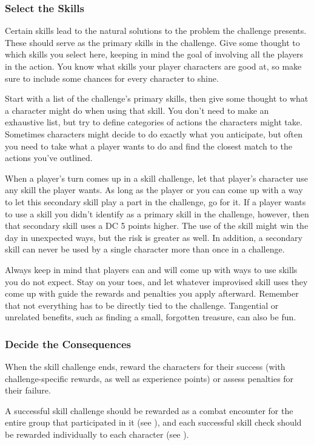 \subsubsection{Select the Skills}
Certain skills lead to the natural solutions to the problem the challenge presents. These should serve as the primary skills in the challenge. Give some thought to which skills you select here, keeping in mind the goal of involving all the players in the action. You know what skills your player characters are good at, so make sure to include some chances for every character to shine.

Start with a list of the challenge's primary skills, then give some thought to what a character might do when using that skill. You don't need to make an exhaustive list, but try to define categories of actions the characters might take. Sometimes characters might decide to do exactly what you anticipate, but often you need to take what a player wants to do and find the closest match to the actions you've outlined.

When a player's turn comes up in a skill challenge, let that player's character use any skill the player wants. As long as the player or you can come up with
a way to let this secondary skill play a part in the challenge, go for it. If a player wants to use a skill you didn't identify as a primary skill in the challenge, however, then that secondary skill uses a DC 5 points higher. The use of the skill might win the day in unexpected ways, but the risk is greater as well. In addition, a secondary skill can never be used by a single character more than once in a challenge.

Always keep in mind that players can and will come up with ways to use skills you do not expect. Stay on your toes, and let whatever improvised skill uses they come up with guide the rewards and penalties you apply afterward. Remember that not everything has to be directly tied to the challenge. Tangential or unrelated benefits, such as finding a small, forgotten treasure, can also be fun.

\subsubsection{Decide the Consequences}
When the skill challenge ends, reward the characters for their success (with challenge-specific rewards, as well as experience points) or assess penalties for their failure.

A successful skill challenge should be rewarded as a combat encounter for the entire group that participated in it (see ), and each successful skill check should be rewarded individually to each character (see ).

